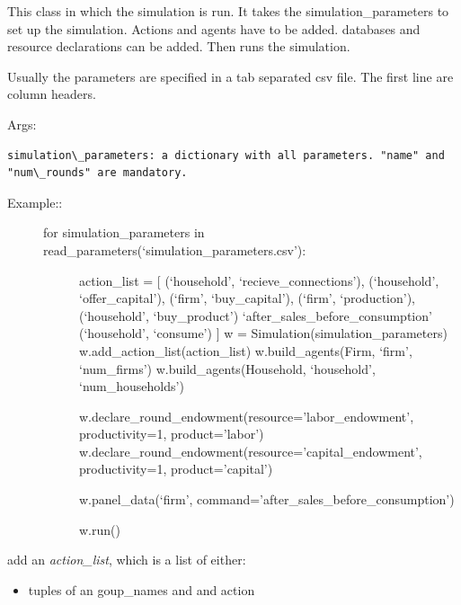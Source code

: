 \documentclass[letterpaper,10pt,english]{sphinxmanual}
\begin{document}
\begin{fulllineitems}
\label{simulation:abce.Simulation}
This class in which the simulation is run. It takes
the simulation\_parameters to set up the simulation. Actions and agents have to be
added. databases and resource declarations can be added. Then runs
the simulation.

Usually the parameters are specified in a tab separated csv file. The first
line are column headers.

Args:

\begin{Verbatim}[commandchars=\\\{\}]
simulation\_parameters: a dictionary with all parameters. "name" and
"num\_rounds" are mandatory.
\end{Verbatim}
\begin{description}
\item[{Example::}] \leavevmode\begin{description}
\item[{for simulation\_parameters in read\_parameters(`simulation\_parameters.csv'):}] \leavevmode
action\_list = {[}
(`household', `recieve\_connections'),
(`household', `offer\_capital'),
(`firm', `buy\_capital'),
(`firm', `production'),
(`household', `buy\_product')
`after\_sales\_before\_consumption'
(`household', `consume')
{]}
w = Simulation(simulation\_parameters)
w.add\_action\_list(action\_list)
w.build\_agents(Firm, `firm', `num\_firms')
w.build\_agents(Household, `household', `num\_households')

w.declare\_round\_endowment(resource='labor\_endowment', productivity=1, product='labor')
w.declare\_round\_endowment(resource='capital\_endowment', productivity=1, product='capital')

w.panel\_data(`firm', command='after\_sales\_before\_consumption')

w.run()

\end{description}

\end{description}

\begin{fulllineitems}
\label{simulation:abce.Simulation.add_action_list}
add an \emph{action\_list}, which is a list of either:
\begin{itemize}
\item {} 
tuples of an goup\_names and and action


\end{itemize}
\end{fulllineitems}
\end{fulllineitems}
\end{document}
